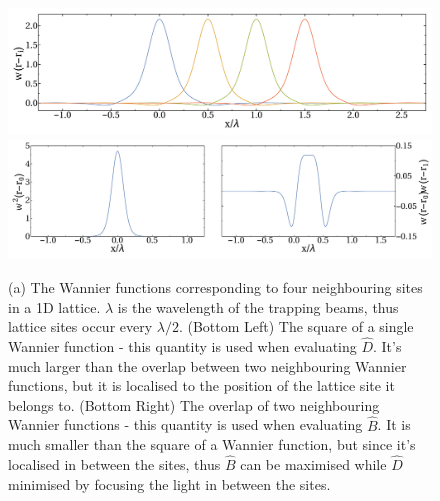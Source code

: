 \begin{figure}[htbp!]
  \centering
  \includegraphics[width=1.0\textwidth]{Wannier1}
  \includegraphics[width=1.0\textwidth]{Wannier2}
  \caption[Wannier Function Overlaps]{(a) The Wannier functions
    corresponding to four neighbouring sites in a 1D
    lattice. $\lambda$ is the wavelength of the trapping beams, thus
    lattice sites occur every $\lambda/2$. (Bottom Left) The square of
    a single Wannier function - this quantity is used when evaluating
    $\hat{D}$. It's much larger than the overlap between two
    neighbouring Wannier functions, but it is localised to the
    position of the lattice site it belongs to. (Bottom Right) The
    overlap of two neighbouring Wannier functions - this quantity is
    used when evaluating $\hat{B}$. It is much smaller than the square
    of a Wannier function, but since it's localised in between the
    sites, thus $\hat{B}$ can be maximised while $\hat{D}$ minimised
    by focusing the light in between the sites.}
  \label{fig:WannierOverlaps}
\end{figure}

